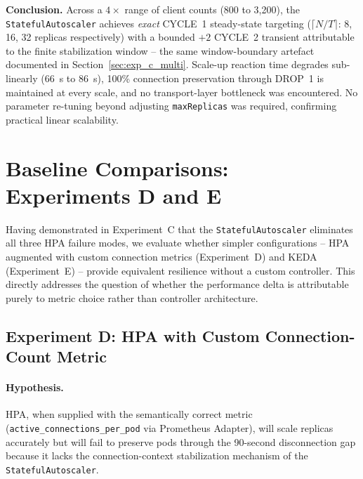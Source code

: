 \documentclass[twocolumn]{svjour3}
\begin{document}
\begin{keyresult}
\noindent\textbf{Conclusion.} Across a $4\times$ range of client counts (800 to
3{,}200), the \texttt{StatefulAutoscaler} achieves \textit{exact} CYCLE~1 steady-state
targeting ($\lceil N / T \rceil$: 8, 16, 32 replicas respectively) with a bounded $+2$
CYCLE~2 transient attributable to the finite stabilization window -- the same
window-boundary artefact documented in Section~\ref{sec:exp_c_multi}. Scale-up
reaction time degrades sub-linearly (66~s to 86~s), 100\% connection preservation
through DROP~1 is maintained at every scale, and no transport-layer bottleneck was
encountered. No parameter re-tuning beyond adjusting \texttt{maxReplicas} was
required, confirming practical linear scalability.
\end{keyresult}



\section{Baseline Comparisons: Experiments D and E}
\label{sec:baselines}

Having demonstrated in Experiment~C that the \texttt{StatefulAutoscaler} eliminates all three
HPA failure modes, we evaluate whether simpler configurations -- HPA augmented with
custom connection metrics (Experiment~D) and KEDA (Experiment~E) -- provide equivalent
resilience without a custom controller. This directly addresses the question of whether the
performance delta is attributable purely to metric choice rather than controller architecture.

\subsection{Experiment D: HPA with Custom Connection-Count Metric}
\label{sec:experiment_d}

\paragraph{Hypothesis.} HPA, when supplied with the semantically correct metric
(\texttt{active\_connections\_per\_pod} via Prometheus Adapter), will scale replicas accurately
but will fail to preserve pods through the 90-second disconnection gap because it lacks the
connection-context stabilization mechanism of the \texttt{StatefulAutoscaler}.
\end{document}
